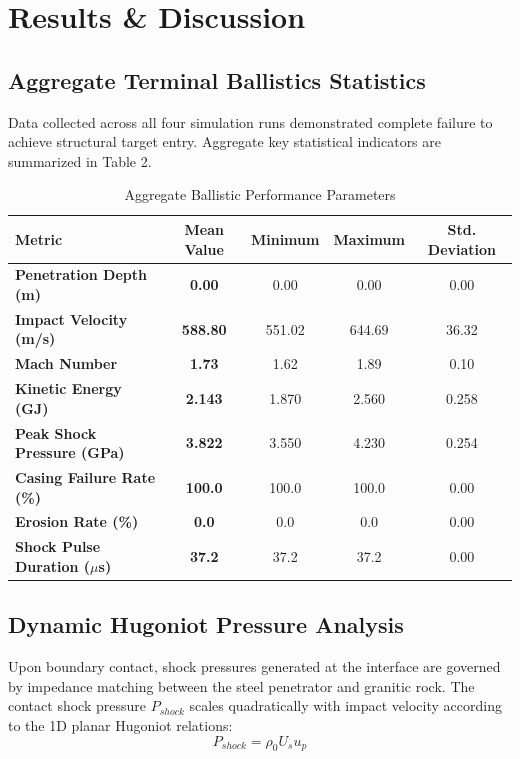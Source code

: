 \documentclass[11pt,a4paper]{article}
\begin{document}
\section{Results \& Discussion}

\subsection{Aggregate Terminal Ballistics Statistics}
Data collected across all four simulation runs demonstrated complete failure to achieve structural target entry. Aggregate key statistical indicators are summarized in Table 2.

\begin{table}[h]
\centering
\begin{tabular}{lcccc}
\toprule
Metric & Mean Value & Minimum & Maximum & Std. Deviation \\
\midrule
\textbf{Penetration Depth (m)} & \textbf{0.00} & 0.00 & 0.00 & 0.00 \\
\textbf{Impact Velocity (m/s)} & \textbf{588.80} & 551.02 & 644.69 & 36.32 \\
\textbf{Mach Number} & \textbf{1.73} & 1.62 & 1.89 & 0.10 \\
\textbf{Kinetic Energy (GJ)} & \textbf{2.143} & 1.870 & 2.560 & 0.258 \\
\textbf{Peak Shock Pressure (GPa)} & \textbf{3.822} & 3.550 & 4.230 & 0.254 \\
\textbf{Casing Failure Rate (\%)} & \textbf{100.0} & 100.0 & 100.0 & 0.00 \\
\textbf{Erosion Rate (\%)} & \textbf{0.0} & 0.0 & 0.0 & 0.00 \\
\textbf{Shock Pulse Duration ($\mu$s)}& \textbf{37.2} & 37.2 & 37.2 & 0.00 \\
\bottomrule
\end{tabular}
\caption{Aggregate Ballistic Performance Parameters}
\end{table}

\subsection{Dynamic Hugoniot Pressure Analysis}
Upon boundary contact, shock pressures generated at the interface are governed by impedance matching between the steel penetrator and granitic rock. The contact shock pressure $P_{shock}$ scales quadratically with impact velocity according to the 1D planar Hugoniot relations:
\begin{equation}
P_{shock} = \rho_0 U_s u_p
\end{equation}
\end{document}
